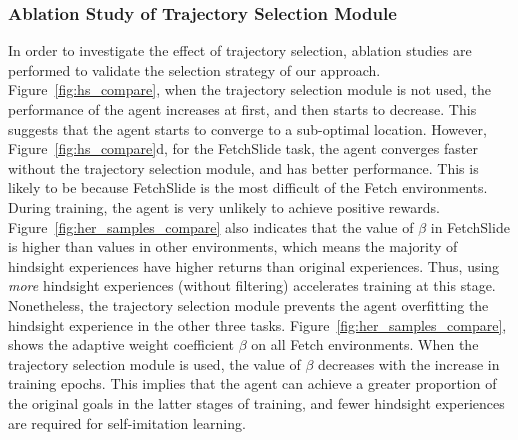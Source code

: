 \subsubsection{Ablation Study of Trajectory Selection Module}
In order to investigate the effect of trajectory selection, {ablation studies are performed} to validate the selection strategy of our approach. {Figure~\ref{fig:hs_compare}}, when the trajectory selection module is not used, the~ performance of the agent increases at first, and then starts to decrease. This suggests that the agent starts to converge to a sub-optimal location. However, {Figure~\ref{fig:hs_compare}d}, for the FetchSlide task, the agent converges faster without the trajectory selection module, and has better performance. {This is likely to be because FetchSlide is the most difficult of the Fetch environments. During training, the agent is very unlikely to achieve positive rewards. Figure~\ref{fig:her_samples_compare} also indicates that the value of $\beta$ in FetchSlide is higher than values in other environments, which means the majority of hindsight experiences have higher returns than original experiences. Thus, using {\em more} hindsight experiences (without filtering) accelerates training at this stage.} Nonetheless, the trajectory selection module prevents the agent overfitting the hindsight experience in the other three tasks. Figure~\ref{fig:her_samples_compare}, shows the adaptive weight coefficient $\beta$ on all Fetch environments. When the trajectory selection module is used, the value of $\beta$ decreases with the increase in training epochs. This implies that the agent can achieve a greater proportion of the original goals in the latter stages of training, and fewer hindsight experiences are required for  self-imitation learning.
